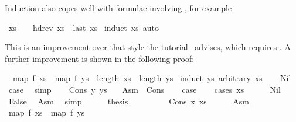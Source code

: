 \begin{isabellebody}
\begin{isamarkuptext}
Induction also copes well with formulae involving \isa{{\isasymLongrightarrow}}, for example%
\end{isamarkuptext}%
\isamarkuptrue%
\isamarkupfalse%
\ {\isachardoublequoteopen}xs\ {\isasymnoteq}\ {\isacharbrackleft}{\isacharbrackright}\ {\isasymLongrightarrow}\ hd{\isacharparenleft}rev\ xs{\isacharparenright}\ {\isacharequal}\ last\ xs{\isachardoublequoteclose}\isanewline
%
\isadelimproof
%
\endisadelimproof
%
\isatagproof
{}\isamarkupfalse%
\ {\isacharparenleft}induct\ xs{\isacharparenright}\ auto%
\endisatagproof
{\isafoldproof}%
%
\isadelimproof
%
\endisadelimproof
%
\begin{isamarkuptext}%
\noindent This is an improvement over that style the
tutorial~\cite{LNCS2283} advises, which requires \isa{{\isasymlongrightarrow}}.
A further improvement is shown in the following proof:%
\end{isamarkuptext}%
\isamarkuptrue%
\isamarkupfalse%
\ \ {\isachardoublequoteopen}map\ f\ xs\ {\isacharequal}\ map\ f\ ys\ {\isasymLongrightarrow}\ length\ xs\ {\isacharequal}\ length\ ys{\isachardoublequoteclose}\isanewline
%
\isadelimproof
%
\endisadelimproof
%
\isatagproof
{}\isamarkupfalse%
\ {\isacharparenleft}induct\ ys\ arbitrary{\isacharcolon}\ xs{\isacharparenright}\isanewline
\ \ \isamarkupfalse%
\ Nil\ \isamarkupfalse%
\ {\isacharquery}case\ \isamarkupfalse%
\ simp\isanewline
{}\isamarkupfalse%
\isanewline
\ \ \isamarkupfalse%
\ {\isacharparenleft}Cons\ y\ ys{\isacharparenright}\ \ \isamarkupfalse%
\ Asm\ {\isacharequal}\ Cons\isanewline
\ \ \isamarkupfalse%
\ {\isacharquery}case\isanewline
\ \ \isamarkupfalse%
\ {\isacharparenleft}cases\ xs{\isacharparenright}\isanewline
\ \ \ \ \isamarkupfalse%
\ Nil\isanewline
\ \ \ \ \isamarkupfalse%
\ False\ \isamarkupfalse%
\ Asm{\isacharparenleft}{}{\isacharparenright}\ \isamarkupfalse%
\ simp\isanewline
\ \ \ \ \isamarkupfalse%
\ {\isacharquery}thesis\ \isacommand{{\isachardot}{\isachardot}}\isamarkupfalse%
\isanewline
\ \ \isamarkupfalse%
\isanewline
\ \ \ \ \isamarkupfalse%
\ {\isacharparenleft}Cons\ x\ xs{\isacharprime}{\isacharparenright}\isanewline
\ \ \ \ \isamarkupfalse%
\ Asm{\isacharparenleft}{}{\isacharparenright}\ \isamarkupfalse%
\ {\isachardoublequoteopen}map\ f\ xs{\isacharprime}\ {\isacharequal}\ map\ f\ ys{\isachardoublequoteclose}\ \isamarkupfalse%

\end{isabellebody}
